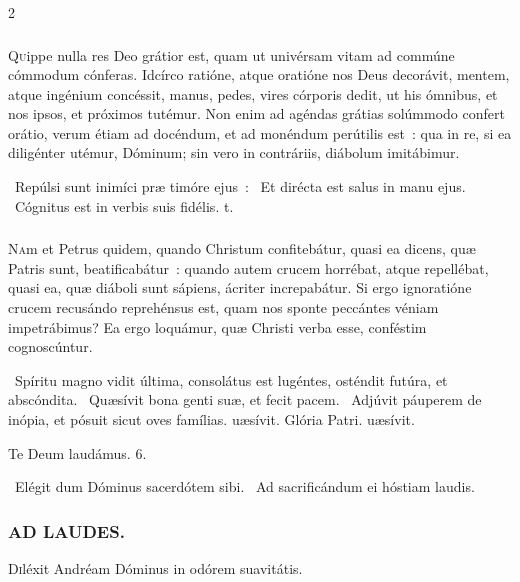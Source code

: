 \documentclass[9pt,twoside]{extarticle}
\begin{document}
\begin{multicols}{2}
{\subsubsection*{\center {}}
\lettrine{Q}uippe nulla res Deo grátior est, quam ut univérsam vitam ad commúne cómmodum cónferas. Idcírco ratióne, atque oratióne nos Deus decorávit, mentem, atque ingénium concéssit, manus, pedes, vires córporis dedit, ut his ómnibus, et nos ipsos, et próximos tutémur. Non enim ad agéndas grátias solúmmodo confert orátio, verum étiam ad docéndum, et ad monéndum perútilis est~: qua in re, si ea diligénter utémur, Dóminum; sin vero in contráriis, diábolum imitábimur.

\begin{tightlist}{}
\item {}~Repúlsi sunt inimíci præ timóre ejus~: \textred{*}~Et dirécta est salus in manu ejus. ~Cógnitus est in verbis suis fidélis. t.
\end{tightlist}

\subsubsection*{\center {}}
\lettrine{N}am et Petrus quidem, quando Christum confitebátur, quasi ea dicens, quæ Patris sunt, beatificabátur~: quando autem crucem horrébat, atque repellébat, quasi ea, quæ diáboli sunt sápiens, ácriter increpabátur. Si ergo ignoratióne crucem recusándo reprehénsus est, quam nos sponte peccántes véniam impetrábimus? Ea ergo loquámur, quæ Christi verba esse, conféstim cognoscúntur.

\begin{tightlist}{}
\item {}~Spíritu magno vidit última, consolátus est lugéntes, osténdit futúra, et abscóndita. \textred{*}~Quæsívit bona genti suæ, et fecit pacem. ~Adjúvit páuperem de inópia, et pósuit sicut oves famílias. uæsívit. Glória Patri. uæsívit.
\item Te Deum laudámus. 6.
\item {}~Elégit dum Dóminus sacerdótem sibi. ~Ad sacrificándum ei hóstiam laudis.
\end{tightlist}

\subsubsection*{\center \textsc{AD LAUDES.}}
\begin{center} \end{center}
\lettrine{D}iléxit Andréam Dóminus in odórem suavitátis.

}
\end{multicols}
\end{document}
